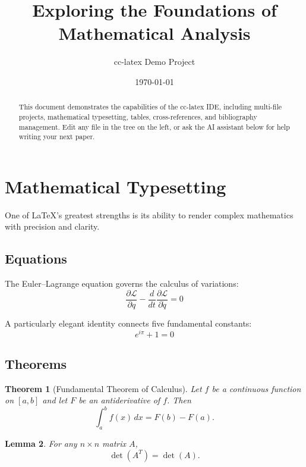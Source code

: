 \documentclass[11pt, a4paper]{article}
\title{Exploring the Foundations of Mathematical Analysis}
\author{cc-latex Demo Project}
\date{\today}
\newtheorem{theorem}{Theorem}
\newtheorem{lemma}[theorem]{Lemma}
\begin{document}
\maketitle

\begin{abstract}
This document demonstrates the capabilities of the cc-latex IDE, including
multi-file projects, mathematical typesetting, tables, cross-references,
and bibliography management. Edit any file in the tree on the left, or ask
the AI assistant below for help writing your next paper.
\end{abstract}

\tableofcontents



\section{Mathematical Typesetting}

One of \LaTeX's greatest strengths is its ability to render complex mathematics
with precision and clarity.

\subsection{Equations}

The Euler--Lagrange equation governs the calculus of variations:
\begin{equation}
  \frac{\partial \mathcal{L}}{\partial q} - \frac{d}{dt}\frac{\partial \mathcal{L}}{\partial \dot{q}} = 0
  \label{eq:euler-lagrange}
\end{equation}

A particularly elegant identity connects five fundamental constants:
\begin{equation}
  e^{i\pi} + 1 = 0
  \label{eq:euler}
\end{equation}

\subsection{Theorems}

\begin{theorem}[Fundamental Theorem of Calculus]
  Let $f$ be a continuous function on $[a, b]$ and let $F$ be an antiderivative
  of $f$. Then
  \[
    \int_a^b f(x) \, dx = F(b) - F(a).
  \]
\end{theorem}

\begin{lemma}
  For any $n \times n$ matrix $A$,
  \[
    \det(A^T) = \det(A).
  \]
\end{lemma}
\end{document}
